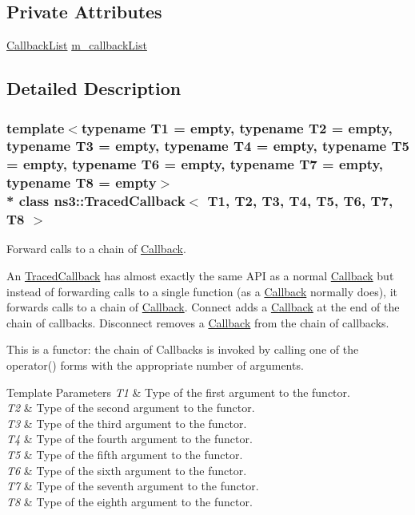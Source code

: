 \subsection*{Private Attributes}
\begin{DoxyCompactItemize}
\item 
\hyperlink{classns3_1_1TracedCallback_a0c8f608ad1d2f8a59df1c7cbfedcc847}{Callback\+List} \hyperlink{classns3_1_1TracedCallback_a62a6b339936be6550a2321334bb24220}{m\+\_\+callback\+List}
\end{DoxyCompactItemize}


\subsection{Detailed Description}
\subsubsection*{template$<$typename T1 = empty, typename T2 = empty, typename T3 = empty, typename T4 = empty, typename T5 = empty, typename T6 = empty, typename T7 = empty, typename T8 = empty$>$\\*
class ns3\+::\+Traced\+Callback$<$ T1, T2, T3, T4, T5, T6, T7, T8 $>$}

Forward calls to a chain of \hyperlink{classns3_1_1Callback}{Callback}. 

An \hyperlink{classns3_1_1TracedCallback}{Traced\+Callback} has almost exactly the same A\+PI as a normal \hyperlink{classns3_1_1Callback}{Callback} but instead of forwarding calls to a single function (as a \hyperlink{classns3_1_1Callback}{Callback} normally does), it forwards calls to a chain of \hyperlink{classns3_1_1Callback}{Callback}. Connect adds a \hyperlink{classns3_1_1Callback}{Callback} at the end of the chain of callbacks. Disconnect removes a \hyperlink{classns3_1_1Callback}{Callback} from the chain of callbacks.

This is a functor\+: the chain of Callbacks is invoked by calling one of the {\ttfamily operator()} forms with the appropriate number of arguments.


\begin{DoxyTemplParams}{Template Parameters}
{\em T1} & Type of the first argument to the functor. \\
\hline
{\em T2} & Type of the second argument to the functor. \\
\hline
{\em T3} & Type of the third argument to the functor. \\
\hline
{\em T4} & Type of the fourth argument to the functor. \\
\hline
{\em T5} & Type of the fifth argument to the functor. \\
\hline
{\em T6} & Type of the sixth argument to the functor. \\
\hline
{\em T7} & Type of the seventh argument to the functor. \\
\hline
{\em T8} & Type of the eighth argument to the functor. \\
\hline
\end{DoxyTemplParams}


